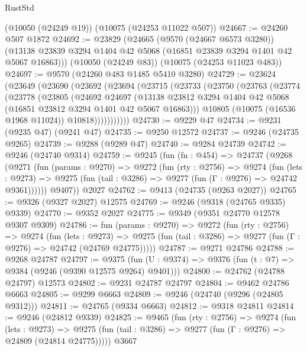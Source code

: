 \begin{lexlean}{RustStd}
\begin{coremodule}
    (@10050 (@24249 @19))
    (@10075 (@24253 @11022 @507))
@24667 := @24260 @507 @1872
@24692 := @23829
    (@24665
      (@9570 (@24667 @6573 @3280))
      (@13138 @23839 @3294 @1404 @42 @5068 (@16851 @23839 @3294 @1401 @42 @5067 @16863)))
    (@10050 (@24249 @83))
    (@10075 (@24253 @11023 @483))
@24697 := @9570 (@24260 @483 @1485 @5410 @3280)
@24729 := @23624
    (@23649
      (@23690
        (@23692
          (@23694
            (@23715
              (@23733
                (@23750
                  (@23763
                    (@23774
                      (@23778
                        (@23805
                          (@24692
                            @24697
                            (@13138
                              @23812
                              @3294
                              @1404
                              @42
                              @5068
                              (@16851 @23812 @3294 @1401 @42 @5067 @16863)))
                          @10805
                          (@10075 (@16536 @1968 @11024))
                          @10818)))))))))))
@24730 := @9229 @47
@24734 := @9231 (@9235 @47) (@9241 @47)
@24735 := @9250 @12572
@24737 := @9246 (@24735 @9265)
@24739 := @9288 (@9289 @47)
@24740 := @9284 @24739
@24742 := @9246 (@24740 @9314)
@24759 := @9245
    (fun (fn : @454) =>
    @24737
      (@9268
        (@9271
          (fun (params : @9270) =>
          @9272
            (fun (rty : @2756) =>
            @9274
              (fun (lets : @9273) =>
              @9275 (fun (tail : @3286) => @9277 (fun (Γ : @9276) => @24742 @9361))))))
        @9407))
    @2027
@24762 := @9413 (@24735 (@9263 @2027))
@24765 := @9326 (@9327 @2027) @12575
@24769 := @9246 (@9318 (@24765 @9335) @9339)
@24770 := @9352 @2027
@24775 := @9349 (@9351 @24770 @12578 @9307 @9309)
@24786 := fun (params : @9270) =>
  @9272
    (fun (rty : @2756) =>
    @9274
      (fun (lets : @9273) =>
      @9275 (fun (tail : @3286) => @9277 (fun (Γ : @9276) => @24742 (@24769 @24775)))))
@24787 := @9271 @24786
@24788 := @9268 @24787
@24797 := @9375
    (fun (U : @9374) => @9376 (fun (t : @7) => @9384 (@9246 (@9390 @12575 @9264) @9401)))
@24800 := @24762 (@24788 @24797) @12573
@24802 := @9231 @24787 @24797
@24804 := @9462 @24786 @6663
@24805 := @9299 @6663
@24809 := @9246 (@24740 (@9296 (@24805 @9312)))
@24811 := @24765 (@9334 @6663)
@24812 := @9318 @24811
@24814 := @9246 (@24812 @9339)
@24825 := @9465
    (fun (rty : @2756) =>
    @9274
      (fun (lets : @9273) =>
      @9275 (fun (tail : @3286) => @9277 (fun (Γ : @9276) => @24809 (@24814 @24775)))))
    @3667

\end{coremodule}
\end{lexlean}
